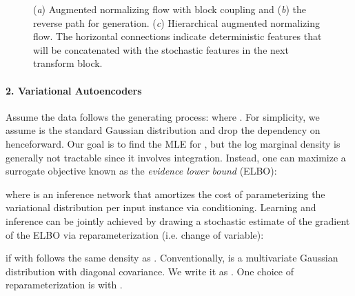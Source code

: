 \documentclass{article}
\begin{document}
\begin{figure*}
{
     }
    \vspace{-0.5cm}
    \caption{\small 
    (\emph{a}) Augmented normalizing flow with block coupling and (\emph{b}) the reverse path for generation. 
    (\emph{c}) Hierarchical augmented normalizing flow. 
    The horizontal connections indicate deterministic features that will be concatenated with the stochastic features in the next transform block.}
    \label{fig:anfs}
\end{figure*}


\paragraph{2. Variational Autoencoders}
Assume the data follows the generating process:  where . 
For simplicity, we assume  is the standard Gaussian distribution and drop the dependency on  henceforward. 
Our goal is to find the MLE for , but the log marginal density  is generally not tractable since it involves integration. 
Instead, one can maximize a surrogate objective known as the \emph{evidence lower bound} (ELBO):

where  is an inference network that amortizes the cost of parameterizing the variational distribution per input instance  via conditioning. 
Learning and inference can be jointly achieved by drawing a stochastic estimate of the gradient of the ELBO via reparameterization (i.e. change of variable):

if  with  follows the same density as . Conventionally,  is a multivariate Gaussian distribution with diagonal covariance. 
We write it as . 
One choice of reparameterization is  with . 
\end{document}
